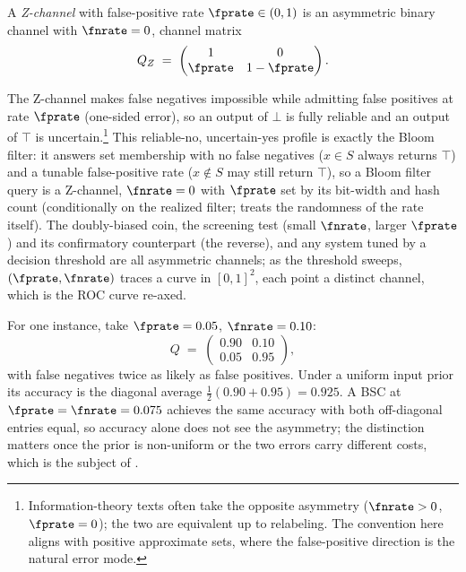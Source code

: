 \begin{definition}[Z-channel]
\label{def:z-channel}
A \emph{Z-channel} with false-positive rate $\fprate \in (0,1)$ is an
asymmetric binary channel with $\fnrate = 0$, channel matrix
\[
  Q_Z \;=\;
  \begin{pmatrix}
    1       & 0 \\
    \fprate & 1 - \fprate
  \end{pmatrix}.
\]
\end{definition}

The Z-channel makes false negatives impossible while admitting false positives
at rate $\fprate$ (one-sided error), so an output of $\bot$ is fully reliable and an output of
$\top$ is uncertain.\footnote{Information-theory texts often take the opposite
asymmetry ($\fnrate > 0$, $\fprate = 0$); the two are equivalent up to
relabeling. The convention here aligns with positive approximate sets, where
the false-positive direction is the natural error mode.} This reliable-no,
uncertain-yes profile is exactly the Bloom filter: it answers set membership
with no false negatives ($x \in S$ always returns $\top$) and a tunable
false-positive rate ($x \notin S$ may still return $\top$), so a Bloom
filter query is a Z-channel, $\fnrate = 0$
with $\fprate$ set by its bit-width and hash count (conditionally on the
realized filter;  treats the randomness of the
rate itself). The doubly-biased coin, the screening test (small $\fnrate$, larger
$\fprate$) and its confirmatory counterpart (the reverse), and any system tuned
by a decision threshold are all asymmetric channels; as the threshold sweeps,
$(\fprate, \fnrate)$ traces a curve in $[0,1]^2$, each point a distinct channel,
which is the ROC curve re-axed.

For one instance, take $\fprate = 0.05$, $\fnrate = 0.10$:
\[
  Q \;=\;
  \begin{pmatrix}
    0.90 & 0.10 \\
    0.05 & 0.95
  \end{pmatrix},
\]
with false negatives twice as likely as false positives. Under a uniform input
prior its accuracy is the diagonal average $\tfrac{1}{2}(0.90 + 0.95) = 0.925$.
A BSC at $\fprate = \fnrate = 0.075$ achieves the same accuracy with both
off-diagonal entries equal, so accuracy alone does not see the asymmetry; the
distinction matters once the prior is non-uniform or the two errors carry
different costs, which is the subject of .

